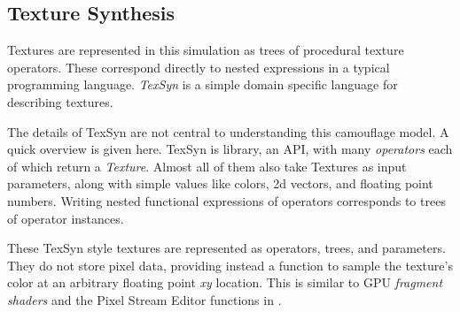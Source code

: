 \documentclass[sigconf]{acmart}
\newcommand{\jargon}[1]{\textit{#1}}
\begin{document}
\subsection{Texture Synthesis}
Textures are represented in this simulation as trees of procedural texture operators. These correspond directly to nested expressions in a typical programming language. \jargon{TexSyn} is a simple domain specific language for describing textures.
\par
The details of TexSyn are not central to understanding this camouflage model. A quick overview is given here. TexSyn is library, an API, with many \jargon{operators} each of which return a \jargon{Texture}. Almost all of them also take Textures as input parameters, along with simple values like colors, 2d vectors, and floating point numbers. Writing nested functional expressions of operators corresponds to trees of operator instances.
\par
These TexSyn style textures are represented as operators, trees, and parameters. They do not store pixel data, providing instead a function to sample the texture's color at an arbitrary floating point \textit{xy} location. This is similar to GPU \jargon{fragment shaders} and the Pixel Stream Editor functions in \cite{perlin_image_1985}.
\par
[... see Figure \ref{fig:TexSyn_overview} ...]
\par


\end{document}
